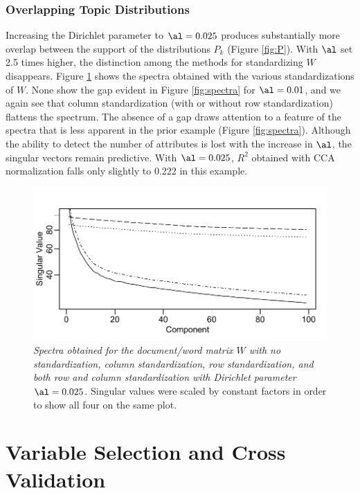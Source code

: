 \documentclass[12pt]{article}
\begin{document}
 
 \subsubsection{Overlapping Topic Distributions} %
 
Increasing the Dirichlet parameter to $\al=0.025$ produces substantially more overlap between the support of the distributions $P_k$ (Figure \ref{fig:P}).  With $\al$ set 2.5 times higher, the distinction among the methods for standardizing  $W$ disappears.  Figure \ref{fig:spectratwo} shows the spectra obtained with the various standardizations of $W$.  None show the gap evident in Figure \ref{fig:spectra} for $\al=0.01$, and we again see that column standardization (with or without row standardization) flattens the spectrum.  The absence of a gap draws attention to a feature of the spectra that is less apparent in the prior example (Figure \ref{fig:spectra}).  Although the ability to detect the number of attributes is lost with the increase in $\al$, the singular vectors remain predictive.  With $\al=0.025$, $R^2$ obtained with CCA normalization falls only slightly to 0.222 in this example.

 
\begin{figure}
\caption{ \label{fig:spectratwo} 
{ \sl Spectra obtained for the document/word matrix $W$ with no standardization, column standardization, row standardization, and both row and column standardization with Dirichlet parameter $\al = 0.025$.}  Singular values were scaled by constant factors in order to show all four on the same plot.}
 \centerline{
 \vspace{0.1in}
 \includegraphics[width=6.0in]{figures/spectra2} }
 \end{figure}

 
\section{Variable Selection and Cross Validation}
\label{sec:cv}
\end{document}
